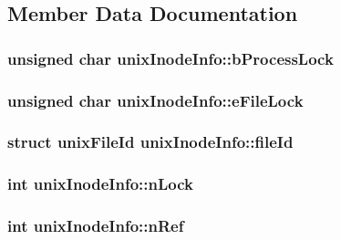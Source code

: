\subsection{Member Data Documentation}
\hypertarget{structunix_inode_info_ade689e4231dd80bb33c86da1e5ed1586}{
\subsubsection[{b\-Process\-Lock}]{\setlength{\rightskip}{0pt plus 5cm}unsigned char unix\-Inode\-Info\-::b\-Process\-Lock}}\label{structunix_inode_info_ade689e4231dd80bb33c86da1e5ed1586}
\hypertarget{structunix_inode_info_a010a765bb3feecb16b650f68fc3a3c1f}{
\subsubsection[{e\-File\-Lock}]{\setlength{\rightskip}{0pt plus 5cm}unsigned char unix\-Inode\-Info\-::e\-File\-Lock}}\label{structunix_inode_info_a010a765bb3feecb16b650f68fc3a3c1f}
\hypertarget{structunix_inode_info_ae692731d449f4462a921dda9a061faa6}{
\subsubsection[{file\-Id}]{\setlength{\rightskip}{0pt plus 5cm}struct {\bf unix\-File\-Id} unix\-Inode\-Info\-::file\-Id}}\label{structunix_inode_info_ae692731d449f4462a921dda9a061faa6}
\hypertarget{structunix_inode_info_a477f3357a32adbc1a9b05017e535444d}{
\subsubsection[{n\-Lock}]{\setlength{\rightskip}{0pt plus 5cm}int unix\-Inode\-Info\-::n\-Lock}}\label{structunix_inode_info_a477f3357a32adbc1a9b05017e535444d}
\hypertarget{structunix_inode_info_a65cbd1fd05ed00f03a252266b04a8221}{
\subsubsection[{n\-Ref}]{\setlength{\rightskip}{0pt plus 5cm}int unix\-Inode\-Info\-::n\-Ref}}\label{structunix_inode_info_a65cbd1fd05ed00f03a252266b04a8221}
